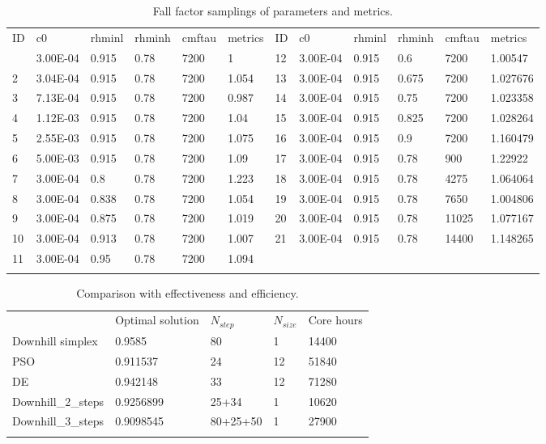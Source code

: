\documentclass[gmd, manuscript]{copernicus}
\begin{document}
\begin{table}[t]
\caption{Fall factor samplings of parameters and metrics.}
\begin{tabular}{l l l l l l l l l l l l}
\tophline
ID & c0 & rhminl & rhminh & cmftau & metrics & ID & c0 & rhminl & rhminh & cmftau & metrics \\
\middlehline
1  & 3.00E-04 & 0.915 & 0.78 & 7200 & 1     & 12 & 3.00E-04 & 0.915 & 0.6   & 7200  & 1.00547 \\
2  & 3.04E-04 & 0.915 & 0.78 & 7200 & 1.054 & 13 & 3.00E-04 & 0.915 & 0.675 & 7200  & 1.027676\\
3  & 7.13E-04 & 0.915 & 0.78 & 7200 & 0.987 & 14 & 3.00E-04 & 0.915 & 0.75  & 7200  & 1.023358\\
4  & 1.12E-03 & 0.915 & 0.78 & 7200 & 1.04  & 15 & 3.00E-04 & 0.915 & 0.825 & 7200  & 1.028264\\
5  & 2.55E-03 & 0.915 & 0.78 & 7200 & 1.075 & 16 & 3.00E-04 & 0.915 & 0.9   & 7200  & 1.160479\\
6  & 5.00E-03 & 0.915 & 0.78 & 7200 & 1.09  & 17 & 3.00E-04 & 0.915 & 0.78  & 900   & 1.22922 \\
7  & 3.00E-04 & 0.8   & 0.78 & 7200 & 1.223 & 18 & 3.00E-04 & 0.915 & 0.78  & 4275  & 1.064064\\
8  & 3.00E-04 & 0.838 & 0.78 & 7200 & 1.054 & 19 & 3.00E-04 & 0.915 & 0.78  & 7650  & 1.004806\\
9  & 3.00E-04 & 0.875 & 0.78 & 7200 & 1.019 & 20 & 3.00E-04 & 0.915 & 0.78  & 11025 & 1.077167\\
10 & 3.00E-04 & 0.913 & 0.78 & 7200 & 1.007 & 21 & 3.00E-04 & 0.915 & 0.78  & 14400 & 1.148265\\
11 & 3.00E-04 & 0.95  & 0.78 & 7200 & 1.094 \\
\bottomhline
\end{tabular}
\belowtable{} %
\end{table}

\begin{table}[t]
\caption{Comparison with effectiveness and efficiency.}
\begin{tabular}{l l l l l}
\tophline
  & Optimal solution & $N_{step}$ & $N_{size}$ & Core hours \\
\middlehline
Downhill simplex & 0.9585    & 80         & 1  & 14400 \\
PSO               & 0.911537  & 24         & 12 & 51840 \\
DE                & 0.942148  & 33         & 12 & 71280 \\
Downhill\_2\_steps  & 0.9256899 & 25+34    &  1 & 10620 \\
Downhill\_3\_steps  & 0.9098545 & 80+25+50 &  1 & 27900 \\
\bottomhline
\end{tabular}
\belowtable{} %
\end{table}
\end{document}
